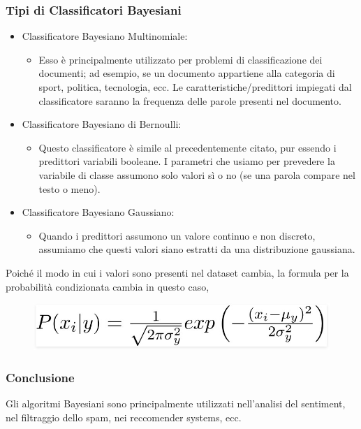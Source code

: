 \subsubsection{Tipi di Classificatori Bayesiani}
\begin{itemize}
\item Classificatore Bayesiano Multinomiale:
\begin{itemize}
\item Esso è principalmente utilizzato per problemi di classificazione dei documenti; ad esempio, se un documento appartiene alla categoria di sport, politica, tecnologia, ecc. Le caratteristiche/predittori impiegati dal classificatore saranno la frequenza delle parole presenti nel documento.
\end{itemize}
\item Classificatore Bayesiano di Bernoulli:
\begin{itemize}
\item Questo classificatore è simile al precedentemente citato, pur essendo i predittori variabili booleane. I parametri che usiamo per prevedere la variabile di classe assumono solo valori sì o no (se una parola compare nel testo o meno).
\end{itemize}
\item Classificatore Bayesiano Gaussiano:
\begin{itemize}
\item Quando i predittori assumono un valore continuo e non discreto, assumiamo che questi valori siano estratti da una distribuzione gaussiana.
\end{itemize}
\end{itemize}
Poiché il modo in cui i valori sono presenti nel dataset cambia, la formula per la probabilità condizionata cambia in questo caso,
\begin{figure}
    \begin{center}    
        \includegraphics[width=1\linewidth]{images/image24.jpeg}
    \end{center}
\end{figure}

\subsubsection{Conclusione}
Gli algoritmi Bayesiani sono principalmente utilizzati nell'analisi del sentiment, nel filtraggio dello spam, nei reccomender systems, ecc. 

